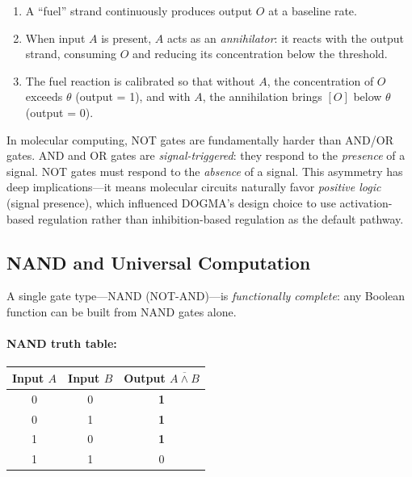 \begin{enumerate}[leftmargin=1.8em]
  \item A ``fuel'' strand continuously produces output $O$ at a baseline rate.
  \item When input $A$ is present, $A$ acts as an \emph{annihilator}: it reacts with the output strand, consuming $O$ and reducing its concentration below the threshold.
  \item The fuel reaction is calibrated so that without $A$, the concentration of $O$ exceeds $\theta$ (output = 1), and with $A$, the annihilation brings $[O]$ below $\theta$ (output = 0).
\end{enumerate}

\begin{keyinsight}
In molecular computing, NOT gates are fundamentally harder than AND/OR gates. AND and OR gates are \emph{signal-triggered}: they respond to the \emph{presence} of a signal. NOT gates must respond to the \emph{absence} of a signal. This asymmetry has deep implications---it means molecular circuits naturally favor \emph{positive logic} (signal presence), which influenced DOGMA's design choice to use activation-based regulation rather than inhibition-based regulation as the default pathway.
\end{keyinsight}

\subsection{NAND and Universal Computation}

A single gate type---NAND (NOT-AND)---is \emph{functionally complete}: any Boolean function can be built from NAND gates alone.

\paragraph{NAND truth table:}
\begin{center}
\renewcommand{\arraystretch}{1.15}
\begin{tabular}{cc|c}
\toprule
\textbf{Input $A$} & \textbf{Input $B$} & \textbf{Output $\overline{A \wedge B}$} \\
\midrule
0 & 0 & \textbf{1} \\
0 & 1 & \textbf{1} \\
1 & 0 & \textbf{1} \\
1 & 1 & 0 \\
\bottomrule
\end{tabular}
\end{center}

